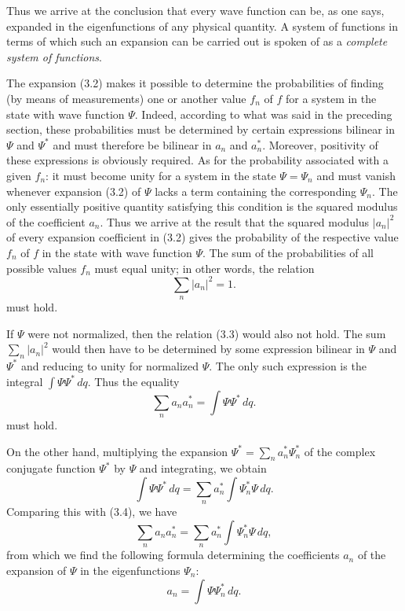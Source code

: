 Thus we arrive at the conclusion that every wave function can be, as one says,
expanded in the eigenfunctions of any physical quantity. A system of functions
in terms of which such an expansion can be carried out is spoken of as a
\emph{complete system of functions}.

The expansion (3.2) makes it possible to determine the probabilities of
finding (by means of measurements) one or another value $f_n$ of $f$ for a
system in the state with wave function $\Psi$. Indeed, according to what was
said in the preceding section, these probabilities must be determined by certain
expressions bilinear in $\Psi$ and $\Psi^*$ and must therefore be bilinear in
$a_n$ and $a_n^*$. Moreover, positivity of these expressions is obviously
required. As for the probability associated with a given $f_n$: it must
become unity for a system in the state $\Psi=\Psi_n$ and must vanish whenever
expansion (3.2) of $\Psi$ lacks a term containing the corresponding $\Psi_n$.
The only essentially positive quantity satisfying this condition is the squared
modulus of the coefficient $a_n$. Thus we arrive at the result that the squared
modulus $|a_n|^2$ of every expansion coefficient in (3.2) gives the
probability of the respective value $f_n$ of $f$ in the state with wave
function $\Psi$. The sum of the probabilities of all possible values $f_n$ must
equal unity; in other words, the relation
\begin{equation}
  \sum_n |a_n|^2 = 1.
  \tag{3.3}
\end{equation}
must hold.

If $\Psi$ were not normalized, then the relation (3.3) would also not hold. The
sum $\sum_n |a_n|^2$ would then have to be determined by some expression
bilinear in $\Psi$ and $\Psi^*$ and reducing to unity for normalized $\Psi$.
The only such expression is the integral $\int\Psi\Psi^*\,dq$. Thus the
equality
\begin{equation}
  \sum_n a_n a_n^* = \int \Psi\Psi^*\,dq.
  \tag{3.4}
\end{equation}
must hold.

On the other hand, multiplying the expansion
$\Psi^*=\sum_n a_n^*\Psi_n^*$ of the complex conjugate function $\Psi^*$ by
$\Psi$ and integrating, we obtain
\[
  \int \Psi\Psi^*\,dq
  = \sum_n a_n^*\int \Psi_n^*\Psi\,dq.
\]
Comparing this with (3.4), we have
\[
  \sum_n a_n a_n^*
  = \sum_n a_n^*\int \Psi_n^*\Psi\,dq,
\]
from which we find the following formula determining the coefficients $a_n$ of
the expansion of $\Psi$ in the eigenfunctions $\Psi_n$:
\begin{equation}
  a_n = \int \Psi\Psi_n^*\,dq.
  \tag{3.5}
\end{equation}

